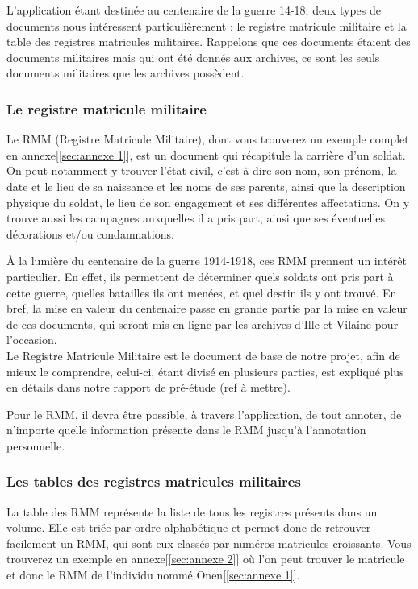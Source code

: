 \documentclass[a4paper]{article}
\begin{document}
L'application étant destinée au centenaire de la guerre 14-18, deux types de documents nous intéressent particulièrement : le registre matricule militaire et la table des registres matricules militaires. Rappelons que ces documents étaient des documents militaires mais qui ont été donnés aux archives, ce sont les seuls documents militaires que les archives possèdent.

\subsubsection{Le registre matricule militaire}
Le RMM (Registre Matricule Militaire), dont vous trouverez un exemple complet en annexe[\ref{sec:annexe 1}], est un document qui récapitule la carrière d'un soldat. On peut notamment y trouver l'état civil, c'est-à-dire son nom, son prénom, la date et le lieu de sa naissance et les noms de ses parents, ainsi que la description physique du soldat, le lieu de son engagement et ses différentes affectations. On y trouve aussi les campagnes auxquelles il a pris part, ainsi que ses éventuelles décorations et/ou condamnations.

\`A la lumière du centenaire de la guerre 1914-1918, ces RMM prennent un intérêt particulier. En effet, ils permettent de déterminer quels soldats ont pris part à cette guerre, quelles batailles ils ont menées, et quel destin ils y ont trouvé. En bref, la mise en valeur du centenaire passe en grande partie par la mise en valeur de ces documents, qui seront mis en ligne par les archives d'Ille et Vilaine pour l'occasion.\\

Le Registre Matricule Militaire est le document de base de notre projet, afin de mieux le comprendre, celui-ci, étant divisé en plusieurs parties, est expliqué plus en détails dans notre rapport de pré-étude (ref à mettre).

Pour le RMM, il devra être possible, à travers l'application, de tout annoter, de n'importe quelle information présente dans le RMM jusqu'à l'annotation personnelle. 

\subsubsection{Les tables des registres matricules militaires}
La table des RMM représente la liste de tous les registres présents dans un volume. Elle est triée par ordre alphabétique et permet donc de retrouver facilement un RMM, qui sont eux classés par numéros matricules croissants. Vous trouverez un exemple en annexe[\ref{sec:annexe 2}] où l'on peut trouver le matricule et donc le RMM de l'individu nommé Onen[\ref{sec:annexe 1}].
\end{document}
